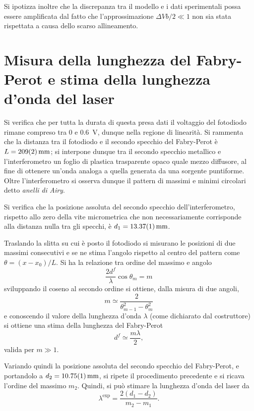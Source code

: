 \documentclass[10pt,oneside,a4paper]{article}
\begin{document}
\begin{multicols}{2}
Si ipotizza inoltre che la discrepanza tra il modello e i dati sperimentali possa essere amplificata dal fatto che l'approssimazione ${\Delta V b/ 2 \ll 1}$ non sia stata rispettata a causa dello scarso allineamento.

\section{Misura della lunghezza del Fabry-Perot e stima della lunghezza d'onda del laser}
Si verifica che per tutta la durata di questa presa dati il voltaggio del fotodiodo rimane compreso tra \SI{0}{} e \SI{0.6}{V}, dunque nella regione di linearità. Si rammenta che la distanza tra il fotodiodo e il secondo specchio del Fabry-Perot è $L=\SI{209 \pm 2}{mm}$; si interpone dunque tra il secondo specchio metallico e l'interferometro un foglio di plastica trasparente opaco quale mezzo diffusore, al fine di ottenere un'onda analoga a quella generata da una sorgente puntiforme. Oltre l'interferometro si osserva dunque il pattern di massimi e minimi circolari detto \emph{anelli di Airy}.

Si verifica che la posizione assoluta del secondo specchio dell'interferometro, rispetto allo zero della vite micrometrica che non necessariamente corrisponde alla distanza nulla tra gli specchi, è $d_1 = \SI{13.37 \pm 0.01}{mm}$.

Traslando la slitta su cui è posto il fotodiodo si misurano le posizioni di due massimi consecutivi e se ne stima l'angolo rispetto al centro del pattern come $\theta = (x-x_0) / L$. Si ha la relazione tra ordine del massimo e angolo 
\begin{equation}\label{eq:diff}
\frac{2d^f}{\lambda} \cos{\theta_m} = m
\end{equation}
sviluppando il coseno al secondo ordine si ottiene, dalla misura di due angoli,
\[
m \simeq \frac{2}{\theta_{m-1}^2 - \theta_{m}^2}
\]
e conoscendo il valore della lunghezza d'onda $\lambda$ (come dichiarato dal costruttore) si ottiene una stima della lunghezza del Fabry-Perot
\[
d^f \simeq \frac{m \lambda}{2},
\]
valida per $m \gg 1$.

Variando quindi la posizione assoluta del secondo specchio del Fabry-Perot, e portandolo a $d_2 = \SI{10.75 \pm 0.01}{mm}$, si ripete il procedimento precedente e si ricava l'ordine del massimo $m_2$. Quindi, si può stimare la lunghezza d'onda del laser da \[
\lambda^{\text{exp}} = \frac{2(d_1 - d_2)}{m_2 - m_1}.
\]


\end{multicols}
\end{document}
